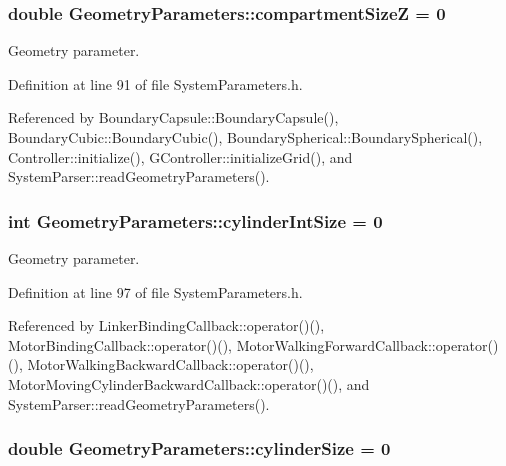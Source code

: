 \hypertarget{structGeometryParameters_a6c0c575c958ad3c0625f63ae3302575c}{
\subsubsection[{compartment\+Size\+Z}]{\setlength{\rightskip}{0pt plus 5cm}double Geometry\+Parameters\+::compartment\+Size\+Z = 0}}\label{structGeometryParameters_a6c0c575c958ad3c0625f63ae3302575c}


Geometry parameter. 



Definition at line 91 of file System\+Parameters.\+h.



Referenced by Boundary\+Capsule\+::\+Boundary\+Capsule(), Boundary\+Cubic\+::\+Boundary\+Cubic(), Boundary\+Spherical\+::\+Boundary\+Spherical(), Controller\+::initialize(), G\+Controller\+::initialize\+Grid(), and System\+Parser\+::read\+Geometry\+Parameters().

\hypertarget{structGeometryParameters_a4ea73a722482f66eeaedfb57435f35d1}{
\subsubsection[{cylinder\+Int\+Size}]{\setlength{\rightskip}{0pt plus 5cm}int Geometry\+Parameters\+::cylinder\+Int\+Size = 0}}\label{structGeometryParameters_a4ea73a722482f66eeaedfb57435f35d1}


Geometry parameter. 



Definition at line 97 of file System\+Parameters.\+h.



Referenced by Linker\+Binding\+Callback\+::operator()(), Motor\+Binding\+Callback\+::operator()(), Motor\+Walking\+Forward\+Callback\+::operator()(), Motor\+Walking\+Backward\+Callback\+::operator()(), Motor\+Moving\+Cylinder\+Backward\+Callback\+::operator()(), and System\+Parser\+::read\+Geometry\+Parameters().

\hypertarget{structGeometryParameters_ab269206056f9e28193129ca5d31d8b30}{
\subsubsection[{cylinder\+Size}]{\setlength{\rightskip}{0pt plus 5cm}double Geometry\+Parameters\+::cylinder\+Size = 0}}\label{structGeometryParameters_ab269206056f9e28193129ca5d31d8b30}


